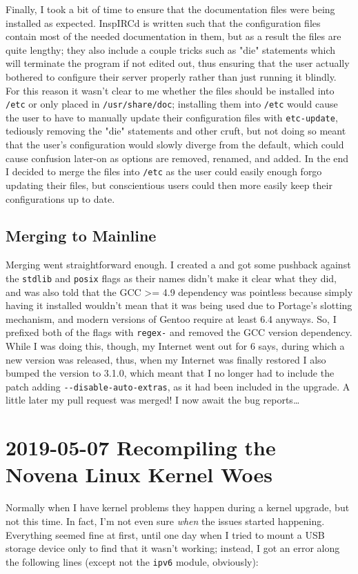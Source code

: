 \documentclass{article}
\begin{document}
Finally, I took a bit of time to ensure that the documentation files were being installed as expected.  InspIRCd is written such that the configuration files contain most of the needed documentation in them, but as a result the files are quite lengthy; they also include a couple tricks such as "die" statements which will terminate the program if not edited out, thus ensuring that the user actually bothered to configure their server properly rather than just running it blindly.  For this reason it wasn't clear to me whether the files should be installed into \texttt{/etc} or only placed in \texttt{/usr/share/doc}; installing them into \texttt{/etc} would cause the user to have to manually update their configuration files with \texttt{etc-update}, tediously removing the "die" statements and other cruft, but not doing so meant that the user's configuration would slowly diverge from the default, which could cause confusion later-on as options are removed, renamed, and added.  In the end I decided to merge the files into \texttt{/etc} as the user could easily enough forgo updating their files, but conscientious users could then more easily keep their configurations up to date.

\subsection{Merging to Mainline}
Merging went straightforward enough.  I created a  and got some pushback against the \texttt{stdlib} and \texttt{posix} flags as their names didn't make it clear what they did, and was also told that the GCC >= 4.9 dependency was pointless because simply having it installed wouldn't mean that it was being used due to Portage's slotting mechanism, and modern versions of Gentoo require at least 6.4 anyways.  So, I prefixed both of the flags with \texttt{regex-} and removed the GCC version dependency.  While I was doing this, though, my Internet went out for 6 says, during which a new version was released, thus, when my Internet was finally restored I also bumped the version to 3.1.0, which meant that I no longer had to include the patch adding \verb|--disable-auto-extras|, as it had been included in the upgrade.  A little later my pull request was merged!  I now await the bug reports\ldots


\section{2019-05-07 Recompiling the Novena Linux Kernel Woes}
Normally\label{2019-05-07-novena-kernel-woes} when I have kernel problems they happen during a kernel upgrade, but not this time.  In fact, I'm not even sure \emph{when} the issues started happening.  Everything seemed fine at first, until one day when I tried to mount a USB storage device only to find that it wasn't working; instead, I got an error along the following lines (except not the \texttt{ipv6} module, obviously):
\end{document}
